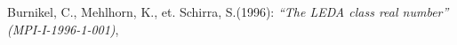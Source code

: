 %
%
\begin{thebibliography}{----}


Burnikel, C., Mehlhorn, K., et. Schirra, S.(1996):
\textit{“The LEDA class real number”}
\textit{(MPI-I-1996-1-001)},


\end{thebibliography}
%
%

